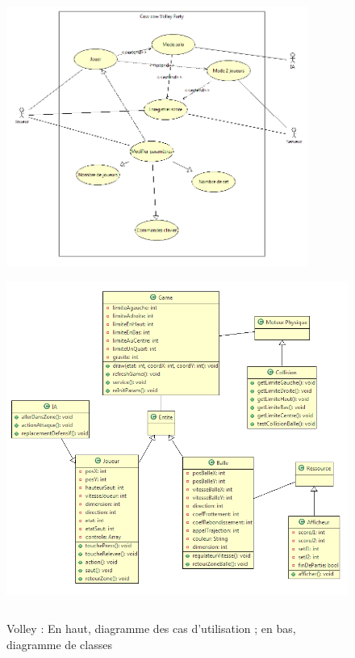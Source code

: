 \begin{figure}[h]
 \centering
 \includegraphics[height=8.5cm]{../umls/UML_images/Volley/utilisation} \hfill
 \includegraphics[height=11cm]{../umls/UML_images/Volley/class} \hfill
 \caption{Volley : En haut, diagramme des cas d'utilisation ; en bas, diagramme de classes}
\end{figure}

